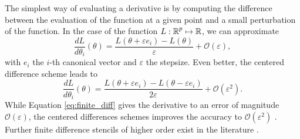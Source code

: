 The simplest way of evaluating a derivative is by computing the difference between the evaluation of the function at a given point and a small perturbation of the function. 
In the case of the function $L : \operatorname{\mathbb{R}}^p \mapsto \operatorname{\mathbb{R}}$, we can approximate
\begin{equation}
 \frac{dL}{d\theta_i} (\theta) = \frac{L(\theta + \varepsilon e_i ) - L(\theta)}{\varepsilon} + \mathcal O (\varepsilon),
 \label{eq:finite_diff}
\end{equation}
with $e_i$ the $i$-th canonical vector and $\varepsilon$ the stepsize. 
Even better, the centered difference scheme leads to
\begin{equation}
 \frac{dL}{d\theta_i} (\theta) 
 =
 \frac{L(\theta + \varepsilon e_i ) - L(\theta - \varepsilon e_i)}{2\varepsilon}
 + \mathcal O (\varepsilon^2).
 \label{eq:finite_diff2}
\end{equation}
While Equation \eqref{eq:finite_diff} gives the derivative to an error of magnitude $\mathcal O (\varepsilon)$, the centered differences schemes improves the accuracy to $\mathcal O (\varepsilon^2)$ \cite{ascher2008-numerical-methods}. 
Further finite difference stencils of higher order exist in the literature \cite{Fornberg1988}. 
 
